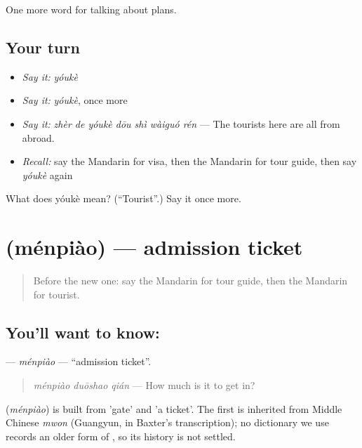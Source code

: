 \begin{grammarlens}[title={What you've built}]
One more word for talking about plans.
\end{grammarlens}

\subsection*{Your turn}
\begin{itemize}
\raggedright
  \item \emph{Say it:} \emph{yóukè}
  \item \emph{Say it:} \emph{yóukè}, once more
  \item \emph{Say it:} \emph{zhèr de yóukè dōu shì wàiguó rén} — The tourists here are all from abroad.
  \item \emph{Recall:} say the Mandarin for visa, then the Mandarin for tour guide, then say \emph{yóukè} again
\end{itemize}

\begin{tcolorbox}[breakable,colback=teal!4,colframe=teal!35!black,title={Before you move on}]
What does yóukè mean? (\textquotedblleft{}Tourist\textquotedblright{}.) Say it once more.
\end{tcolorbox}
\section[\texorpdfstring{\zh{门票} (ménpiào)}{门票 (ménpiào)}]{ (ménpiào) — admission ticket}

\label{lesson:ZH-C213-menpiao}



\begin{quote}
Before the new one: say the Mandarin for tour guide, then the Mandarin for tourist.
\end{quote}

\subsection*{You'll want to know: }
\textbf{} — \emph{ménpiào} — \textquotedblleft{}admission ticket\textquotedblright{}.

\begin{quote}
\textbf{} \emph{ménpiào duōshao qián} — How much is it to get in?
\end{quote}

\begin{cousinweb}
\textbf{} (\emph{ménpiào}) is built from  'gate' and  'a ticket'. The first is inherited from Middle Chinese \emph{mwon} (Guangyun, in Baxter's transcription); no dictionary we use records an older form of , so its history is not settled.
\end{cousinweb}

